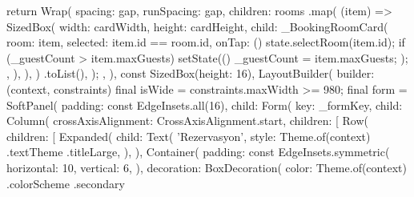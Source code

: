 \documentclass[11pt,a4paper]{article}
\begin{document}
\begin{codeblock}
{{{{                      return Wrap(
                        spacing: gap,
                        runSpacing: gap,
                        children: rooms
                            .map(
                              (item) => SizedBox(
                                width: cardWidth,
                                height: cardHeight,
                                child: _BookingRoomCard(
                                  room: item,
                                  selected: item.id == room.id,
                                  onTap: () {
                                    state.selectRoom(item.id);
                                    if (_guestCount > item.maxGuests) {
                                      setState(() {
                                        _guestCount = item.maxGuests;
                                      });
                                    }
                                  },
                                ),
                              ),
                            )
                            .toList(),
                      );
                    },
                  ),
                  const SizedBox(height: 16),
                  LayoutBuilder(
                    builder: (context, constraints) {
                      final isWide = constraints.maxWidth >= 980;
                      final form = SoftPanel(
                        padding: const EdgeInsets.all(16),
                        child: Form(
                          key: _formKey,
                          child: Column(
                            crossAxisAlignment: CrossAxisAlignment.start,
                            children: [
                              Row(
                                children: [
                                  Expanded(
                                    child: Text(
                                      'Rezervasyon',
                                      style: Theme.of(context)
                                          .textTheme
                                          .titleLarge,
                                    ),
                                  ),
                                  Container(
                                    padding: const EdgeInsets.symmetric(
                                      horizontal: 10,
                                      vertical: 6,
                                    ),
                                    decoration: BoxDecoration(
                                      color: Theme.of(context)
                                          .colorScheme
                                          .secondary
}}}}
\end{codeblock}
\end{document}
